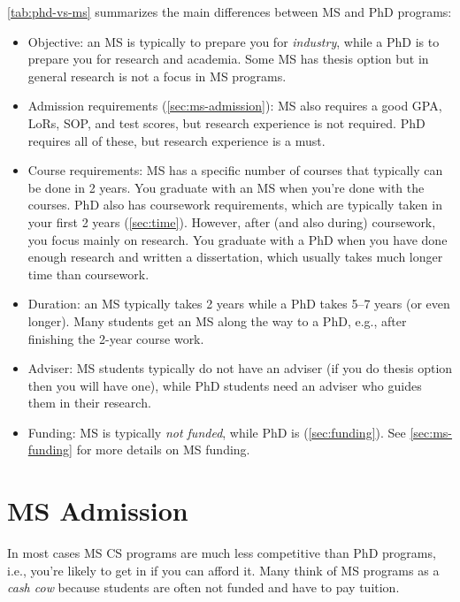 \documentclass[oneside,11pt,dvipsnames]{book}
\begin{document}
\autoref{tab:phd-vs-ms} summarizes the main differences between MS and PhD programs:
\begin{itemize}

  \item Objective: an MS is typically to prepare you for \emph{industry}, while a PhD is to prepare you for research and academia. Some MS has thesis option but in general research is not a focus in MS programs.

  \item Admission requirements (\autoref{sec:ms-admission}): MS also requires a good GPA, LoRs, SOP, and test scores, but research experience is not required.  PhD requires all of these, but research experience is a must.
  
  \item Course requirements: MS has a specific number of courses that typically can be done in 2 years. You graduate with an MS when you're done with the courses. PhD also has coursework requirements, which are typically taken in your first 2 years  (\autoref{sec:time}). However, after (and also during) coursework, you focus mainly on research.  You graduate with a PhD when you have done enough research and written a dissertation, which usually takes much longer time than coursework.
  
  \item Duration: an MS typically takes 2 years while a PhD takes 5--7 years (or even longer).  Many students get an MS along the way to a PhD, e.g., after finishing the 2-year course work.
  
  \item Adviser: MS students typically do not have an adviser (if you do thesis option then you will have one), while PhD students need an adviser who guides them in their research.
  
  \item Funding: MS is typically \emph{not funded}, while PhD is (\autoref{sec:funding}). See \autoref{sec:ms-funding} for more details on MS funding.
  
\end{itemize}

\section{MS Admission}\label{sec:ms-admission}

In most cases MS CS programs are much less competitive than PhD programs, i.e., you're likely to get in if you can afford it. Many think of MS programs as a \emph{cash cow} because students are often not funded and have to pay tuition. 
\end{document}
